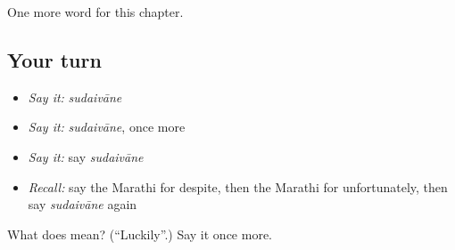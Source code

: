 \begin{grammarlens}[title={What you've built}]
One more word for this chapter.
\end{grammarlens}

\subsection*{Your turn}
\begin{itemize}
\raggedright
  \item \emph{Say it:} \emph{sudaivāne}
  \item \emph{Say it:} \emph{sudaivāne}, once more
  \item \emph{Say it:} say \emph{sudaivāne}
  \item \emph{Recall:} say the Marathi for despite, then the Marathi for unfortunately, then say \emph{sudaivāne} again
\end{itemize}

\begin{tcolorbox}[breakable,colback=teal!4,colframe=teal!35!black,title={Before you move on}]
What does  mean? (\textquotedblleft{}Luckily\textquotedblright{}.) Say it once more.
\end{tcolorbox}

